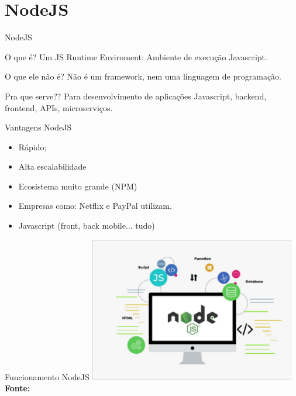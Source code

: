 \documentclass{beamer}
\begin{document}
\section{NodeJS}
\begin{frame}{NodeJS}
    \begin{block}{O que é?}
        Um \alert{JS Runtime Enviroment}: Ambiente de execução Javascript.
  \end{block}
  \begin{exampleblock}{O que ele não é?}        
    Não é um framework, nem uma linguagem de programação.
  \end{exampleblock}
  \begin{alertblock}{Pra que serve??}
    Para desenvolvimento de aplicações Javascript, backend, frontend, APIs, microserviços.
  \end{alertblock}
\end{frame}
\begin{frame}{Vantagens NodeJS}
	\begin{itemize}
	\item Rápido;
	\item Alta escalabilidade
	\item Ecosistema muito grande (NPM)
	\item Empresas como: Netflix e PayPal utilizam.
	\item Javascript (front, back mobile... tudo)
	\end{itemize}
\end{frame}
\begin{frame}{Funcionamento NodeJS}
    \includegraphics[width=90mm]{resources/aula1_5.png}\\
    \tiny{\textbf{Fonte:} \cite{ich2021}}
\end{frame}
\end{document}

